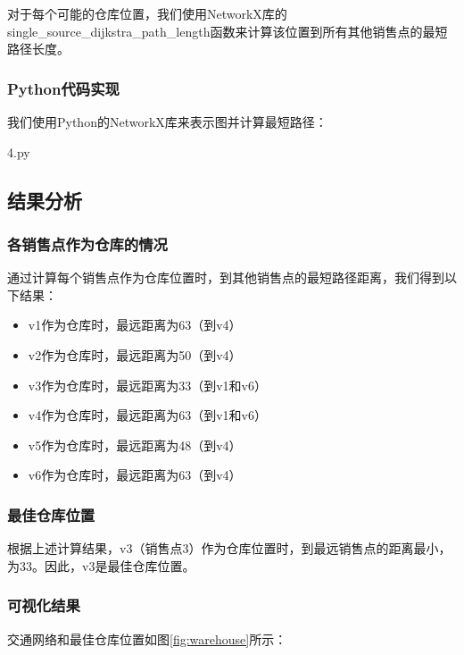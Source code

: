 \documentclass[bwprint]{cumcmthesis}
\begin{document}
对于每个可能的仓库位置，我们使用NetworkX库的single\_source\_dijkstra\_path\_length函数来计算该位置到所有其他销售点的最短路径长度。

\subsubsection{Python代码实现}
我们使用Python的NetworkX库来表示图并计算最短路径：

\noindent 4.py
    

\subsection{结果分析}

\subsubsection{各销售点作为仓库的情况}
通过计算每个销售点作为仓库位置时，到其他销售点的最短路径距离，我们得到以下结果：

\begin{itemize}
    \item v1作为仓库时，最远距离为63（到v4）
    \item v2作为仓库时，最远距离为50（到v4）
    \item v3作为仓库时，最远距离为33（到v1和v6）
    \item v4作为仓库时，最远距离为63（到v1和v6）
    \item v5作为仓库时，最远距离为48（到v4）
    \item v6作为仓库时，最远距离为63（到v4）
\end{itemize}

\subsubsection{最佳仓库位置}
根据上述计算结果，v3（销售点3）作为仓库位置时，到最远销售点的距离最小，为33。因此，v3是最佳仓库位置。

\subsubsection{可视化结果}
交通网络和最佳仓库位置如图\ref{fig:warehouse}所示：
\end{document}
